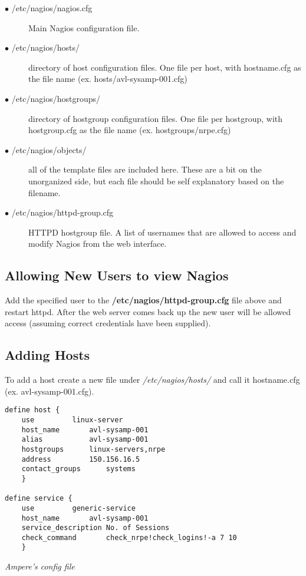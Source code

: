 \documentclass[a4paper]{article}
\begin{document}
\begin{description}
  \item[$\bullet$ /etc/nagios/nagios.cfg] Main Nagios configuration file.
  \item[$\bullet$ /etc/nagios/hosts/] directory of host configuration files. One file per host, with hostname.cfg as the file name (ex. hosts/avl-sysamp-001.cfg)
  \item[$\bullet$ /etc/nagios/hostgroups/] directory of hostgroup configuration files. One file per hostgroup, with hostgroup.cfg as the file name (ex. hostgroups/nrpe.cfg)
  \item[$\bullet$ /etc/nagios/objects/] all of the template files are included here. These are a bit on the unorganized side, but each file should be self explanatory based on the filename.
  \item[$\bullet$ /etc/nagios/httpd-group.cfg] HTTPD hostgroup file. A list of usernames that are allowed to access and modify Nagios from the web interface.
\end{description}

\subsection{Allowing New Users to view Nagios}
Add the specified user to the \textbf{/etc/nagios/httpd-group.cfg} file above and restart httpd. After the web server comes back up the new user will be allowed access (assuming correct credentials have been supplied).

\subsection{Adding Hosts}

To add a host create a new file under \textit{/etc/nagios/hosts/} and call it hostname.cfg (ex. avl-sysamp-001.cfg).
\\

\begin{lstlisting}[language=nagconf]
define host {
	use			linux-server
	host_name		avl-sysamp-001
	alias			avl-sysamp-001
	hostgroups		linux-servers,nrpe
	address			150.156.16.5
	contact_groups		systems
	}

define service {
	use			generic-service
	host_name		avl-sysamp-001
	service_description	No. of Sessions
	check_command		check_nrpe!check_logins!-a 7 10
    }
\end{lstlisting}
\hfill \textit{Ampere's config file}\\
\end{document}
